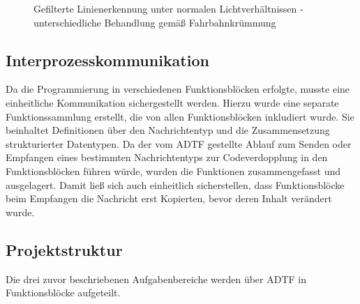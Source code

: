\documentclass[12pt, a4paper]{scrartcl}
\begin{document}
\begin{figure}
	\caption{Gefilterte Linienerkennung unter normalen Lichtverhältnissen - unterschiedliche Behandlung gemäß Fahrbahnkrümmung}
	\label{img:line_filt_normal_u_kurve}
\end{figure}


\clearpage

\subsection{Interprozesskommunikation}

Da die Programmierung in verschiedenen Funktionsblöcken erfolgte, musste eine einheitliche Kommunikation sichergestellt werden. Hierzu wurde eine separate Funktionssammlung erstellt, die von allen Funktionsblöcken inkludiert wurde. Sie beinhaltet Definitionen über den Nachrichtentyp und die Zusammensetzung strukturierter Datentypen. Da der vom ADTF gestellte Ablauf zum Senden oder Empfangen eines bestimmten Nachrichtentyps zur Codeverdopplung in den Funktionsblöcken führen würde, wurden die Funktionen zusammengefasst und ausgelagert. Damit ließ sich auch einheitlich sicherstellen, dass Funktionsblöcke beim Empfangen die Nachricht erst Kopierten, bevor deren Inhalt verändert wurde.

\subsection{Projektstruktur}
Die drei zuvor beschriebenen Aufgabenbereiche werden über ADTF in Funktionsblöcke aufgeteilt.
\end{document}
